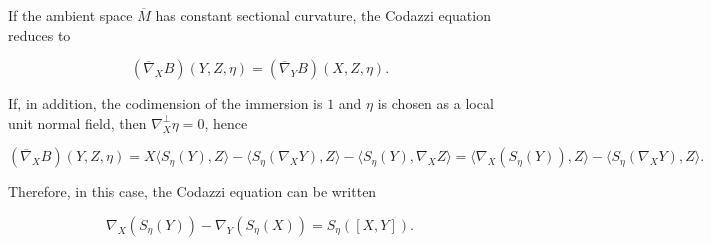 \begin{remark}
  \label{rem:dc-ch6-3-5}
  \leanok
  \sketch
  If the ambient space $\overline{M}$ has constant sectional curvature, the Codazzi
  equation reduces to
  
  $$
  (\overline{\nabla}_X B)(Y,Z,\eta)=(\overline{\nabla}_Y B)(X,Z,\eta).
  $$
  
  If, in addition, the codimension of the immersion is $1$ and $\eta$ is chosen as a
  local unit normal field, then
  $\nabla_X^\perp\eta=0$, hence
  
  $$
  (\overline{\nabla}_X B)(Y,Z,\eta)=X\langle S_\eta(Y),Z\rangle-\langle S_\eta(\nabla_X Y),Z\rangle-\langle S_\eta(Y),\nabla_X Z\rangle=\langle\nabla_X(S_\eta(Y)),Z\rangle-\langle S_\eta(\nabla_X Y),Z\rangle.
  $$
  
  Therefore, in this case, the Codazzi equation can be written
  
  $$
  \nabla_X(S_\eta(Y))-\nabla_Y(S_\eta(X))=S_\eta([X,Y]).
  $$
  
\end{remark}
